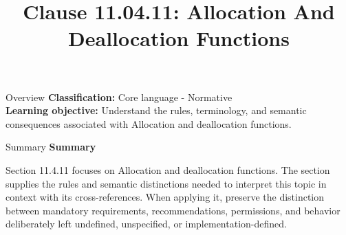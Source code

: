 \documentclass[10pt,letterpaper]{article}
\title{Clause 11.04.11: Allocation And Deallocation Functions}
\author{}
\date{}
\begin{document}
\maketitle
\begin{CornellOverviewBox}{Overview}
\textbf{Classification:} Core language - Normative\\[2pt]
\textbf{Learning objective:} Understand the rules, terminology, and semantic consequences associated with Allocation and deallocation functions.
\end{CornellOverviewBox}\begin{CornellSummaryBox}{Summary}
{\sffamily\bfseries\color{Accent} Summary}\par\vspace{3pt}Section 11.4.11 focuses on Allocation and deallocation functions. The section supplies the rules and semantic distinctions needed to interpret this topic in context with its cross-references. When applying it, preserve the distinction between mandatory requirements, recommendations, permissions, and behavior deliberately left undefined, unspecified, or implementation-defined.
\end{CornellSummaryBox}
\end{document}
